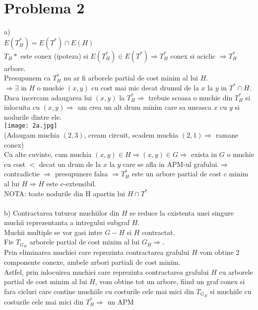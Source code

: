 \documentclass{article}
\begin{document}
\section*{Problema 2}
\Large
a) \\
$E(T_H^*)=E(T^*) \cap E(H)$\\
$T_H*$ este conex (ipoteza) si $E(T_H^*)\in E(T^*)\Rightarrow T_H^*$ conex si aciclic $\Rightarrow T_H^*$ arbore. \\
Presupunem ca $ T_H^*$ nu ar fi arborele partial de cost minim al lui $H$.\\
$\Rightarrow \exists$ in $H$ o muchie $(x,y)$ cu cost mai mic decat drumul de la $x$ la $y$ in $ T^* \cap H$.\\
Daca incercam adaugarea lui $(x,y)$ la $ T_H^* \Rightarrow $ trebuie scoasa o muchie din $ T_H^*$ si inlocuita cu $(x,y)\Rightarrow$ am crea un alt drum minim care sa uneasca $x$ cu $y$ si nodurile dintre ele.\\
 \texttt{[image: 2a.jpg]}\\
 (Adaugam muchia $(2,3)$, cream circuit, scadem muchia $(2,1)\Rightarrow$ ramane conex)\\
Cu alte cuvinte, cum muchia $(x,y)\in H\Rightarrow (x,y) \in G\Rightarrow $ exista in $G$ o muchie cu cost $<$ decat un drum de la $x$ la $y$ care se afla in APM-ul grafului.$\Rightarrow$ contradictie $\Rightarrow$ presupunere falsa $\Rightarrow T_H^*$ este un arbore partial de cost $c$ minim al lui $H \Rightarrow H$ este $c$-extensibil.   \\ 
NOTA: toate nodurile din H apartin lui $H \cap T^*$\\
 \bigskip\\
b) Contractarea tuturor muchiilor din $H$ se reduce la existenta unei singure muchii reprezentanta a intregului subgraf $H$.\\
Muchii multiple se vor gasi intre $G-H$ si $H$ contractat.\\
Fie $T_{G_H}$ arborele partial de cost minim al lui $G_H\Rightarrow$.\\
Prin eliminarea muchiei care reprezinta contractarea grafului $H$ vom obtine 2 componente conexe, ambele arbori partiali de cost minim.\\
Astfel, prin inlocuirea muchiei care reprezinta contractarea grafului $H$  cu arborele partial de cost minim al lui $H$, vom obtine tot un arbore, fiind un graf conex si fara cicluri care contine muchiile cu costurile cele mai mici din $T_{G_H}$ si muchiile cu costurile cele mai mici din $T_H^*\Rightarrow$ un APM
\end{document}
